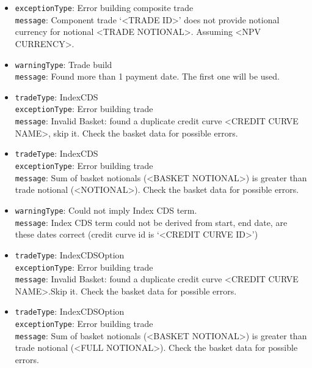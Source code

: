 \begin{itemize}
  \item \lstinline!exceptionType!: Error building composite trade \\
        \lstinline!message!: Component trade `<TRADE ID>' does not provide notional currency for notional <TRADE NOTIONAL>. Assuming <NPV CURRENCY>.

  \item \lstinline!warningType!: Trade build \\
        \lstinline!message!: Found more than 1 payment date. The first one will be used.

  \item \lstinline!tradeType!: IndexCDS \\
        \lstinline!exceptionType!: Error building trade \\
        \lstinline!message!: Invalid Basket: found a duplicate credit curve <CREDIT CURVE NAME>, skip it. Check the basket data for possible errors.

  \item \lstinline!tradeType!: IndexCDS \\
        \lstinline!exceptionType!: Error building trade \\
        \lstinline!message!: Sum of basket notionals (<BASKET NOTIONAL>) is greater than trade notional (<NOTIONAL>). Check the basket data for possible errors.

  \item \lstinline!warningType!: Could not imply Index CDS term. \\
        \lstinline!message!: Index CDS term could not be derived from start, end date, are these dates correct (credit curve id is `<CREDIT CURVE ID>')

  \item \lstinline!tradeType!: IndexCDSOption \\
        \lstinline!exceptionType!: Error building trade \\
        \lstinline!message!: Invalid Basket: found a duplicate credit curve <CREDIT CURVE NAME>.Skip it. Check the basket data for possible errors.

  \item \lstinline!tradeType!: IndexCDSOption \\
        \lstinline!exceptionType!: Error building trade \\
        \lstinline!message!: Sum of basket notionals (<BASKET NOTIONAL>) is greater than trade notional (<FULL NOTIONAL>). Check the basket data for possible errors.


\end{itemize}
